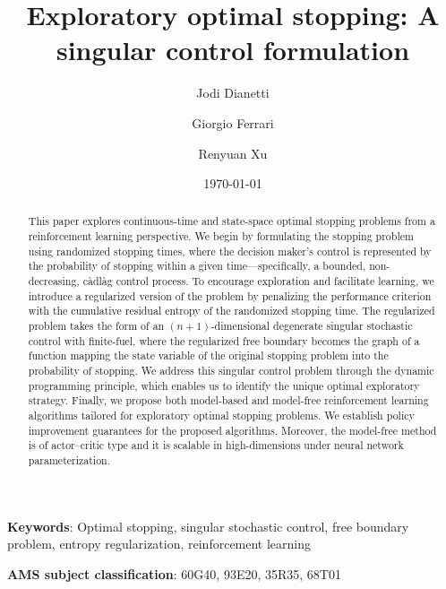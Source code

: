 \documentclass[11pt]{amsart}
\title[Exploratory OS]{Exploratory optimal stopping: A singular control formulation}
\author[Dianetti]{Jodi Dianetti}
\author[Ferrari]{Giorgio Ferrari}
\author[Xu]{Renyuan Xu}
\date{\today}
\theoremstyle{plain}
\numberwithin{equation}{section}
\begin{document}
\begin{abstract}
This paper explores continuous-time and state-space optimal stopping problems from a reinforcement learning perspective. We begin by formulating the stopping problem using randomized stopping times, where the decision maker's control is represented by the probability of stopping within a given time—specifically, a bounded, non-decreasing, càdlàg control process. 
To encourage exploration and facilitate learning, we introduce a regularized version of the problem by penalizing the performance criterion with the cumulative residual entropy of the randomized stopping time.  The regularized problem takes the form of an $(n+1)$-dimensional degenerate singular stochastic control with finite-fuel, where the regularized free boundary becomes the graph of a function mapping the state variable of the original stopping problem into the probability of stopping. 
We address this singular control problem through the dynamic programming principle, which enables us to identify the unique optimal exploratory strategy.  
Finally, we propose both model-based and model-free reinforcement learning algorithms tailored for exploratory optimal stopping problems. We establish policy improvement guarantees for the proposed algorithms. Moreover, the model-free method is of actor–critic type and it is scalable in high-dimensions under neural network parameterization.


\end{abstract} 
\maketitle  
\smallskip 
{\textbf{Keywords}}:
Optimal stopping, singular stochastic control, free boundary problem, entropy regularization, reinforcement learning

\smallskip 
{\textbf{AMS subject classification}}: 
60G40,  %
93E20, %
35R35,  %
68T01  %
\tableofcontents
\end{document}
